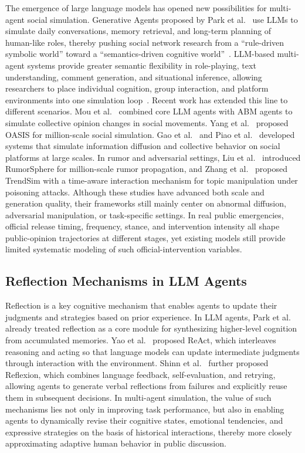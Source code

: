 The emergence of large language models has opened new possibilities for multi-agent social simulation. Generative Agents proposed by Park et al.~\citep{park2023generative} use LLMs to simulate daily conversations, memory retrieval, and long-term planning of human-like roles, thereby pushing social network research from a “rule-driven symbolic world” toward a “semantics-driven cognitive world”~\citep{li2026abm}. LLM-based multi-agent systems provide greater semantic flexibility in role-playing, text understanding, comment generation, and situational inference, allowing researchers to place individual cognition, group interaction, and platform environments into one simulation loop~\citep{gaoc2024survey, park2023generative}. Recent work has extended this line to different scenarios. Mou et al.~\citep{mou2024socialmovement} combined core LLM agents with ABM agents to simulate collective opinion changes in social movements. Yang et al.~\citep{yang2024oasis} proposed OASIS for million-scale social simulation. Gao et al.~\citep{gao2023s3} and Piao et al.~\citep{piao2025agentsociety} developed systems that simulate information diffusion and collective behavior on social platforms at large scales. In rumor and adversarial settings, Liu et al.~\citep{liu2025rumorsphere} introduced RumorSphere for million-scale rumor propagation, and Zhang et al.~\citep{zhang2024trendsim} proposed TrendSim with a time-aware interaction mechanism for topic manipulation under poisoning attacks. Although these studies have advanced both scale and generation quality, their frameworks still mainly center on abnormal diffusion, adversarial manipulation, or task-specific settings. In real public emergencies, official release timing, frequency, stance, and intervention intensity all shape public-opinion trajectories at different stages, yet existing models still provide limited systematic modeling of such official-intervention variables.

\subsection{Reflection Mechanisms in LLM Agents}

Reflection is a key cognitive mechanism that enables agents to update their judgments and strategies based on prior experience. In LLM agents, Park et al.~\citep{park2023generative} already treated reflection as a core module for synthesizing higher-level cognition from accumulated memories. Yao et al.~\citep{yao2023react} proposed ReAct, which interleaves reasoning and acting so that language models can update intermediate judgments through interaction with the environment. Shinn et al.~\citep{shinn2023reflexion} further proposed Reflexion, which combines language feedback, self-evaluation, and retrying, allowing agents to generate verbal reflections from failures and explicitly reuse them in subsequent decisions. In multi-agent simulation, the value of such mechanisms lies not only in improving task performance, but also in enabling agents to dynamically revise their cognitive states, emotional tendencies, and expressive strategies on the basis of historical interactions, thereby more closely approximating adaptive human behavior in public discussion.

